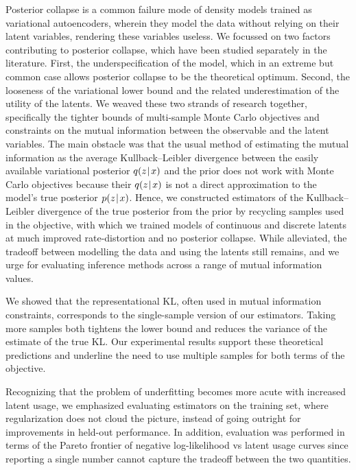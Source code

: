 \mglconclusion
Posterior collapse is a common failure mode of density models trained as variational autoencoders, wherein they model the data without relying on their latent variables, rendering these variables useless.
We focussed on two factors contributing to posterior collapse, which have been studied separately in the literature.
First, the underspecification of the model, which in an extreme but common case allows posterior collapse to be the theoretical optimum.
Second, the looseness of the variational lower bound and the related underestimation of the utility of the latents.
We weaved these two strands of research together, specifically the tighter bounds of multi-sample Monte Carlo objectives and constraints on the mutual information between the observable and the latent variables.
The main obstacle was that the usual method of estimating the mutual information as the average Kullback--Leibler divergence between the easily available variational posterior $q(z\hspace{0.08em}|\hspace{0.11em} x)$ and the prior does not work with Monte Carlo objectives because their $q(z\hspace{0.08em}|\hspace{0.11em} x)$ is not a direct approximation to the model's true posterior $p(z\hspace{0.08em}|\hspace{0.11em} x)$.
Hence, we constructed estimators of the Kullback--Leibler divergence of the true posterior from the prior by recycling samples used in the objective, with which we trained models of continuous and discrete latents at much improved rate-distortion and no posterior collapse.
While alleviated, the tradeoff between modelling the data and using the latents still remains, and we urge for evaluating inference methods across a range of mutual information values.

We showed that the representational KL, often used in mutual information constraints, corresponds to the single-sample version of our estimators.
Taking more samples both tightens the lower bound and reduces the variance of the estimate of the true KL.
Our experimental results support these theoretical predictions and underline the need to use multiple samples for both terms of the objective.

Recognizing that the problem of underfitting becomes more acute with increased latent usage, we emphasized evaluating estimators on the training set, where regularization does not cloud the picture, instead of going outright for improvements in held-out performance.
In addition, evaluation was performed in terms of the Pareto frontier of negative log-likelihood vs latent usage curves since reporting a single number cannot capture the tradeoff between the two quantities.

